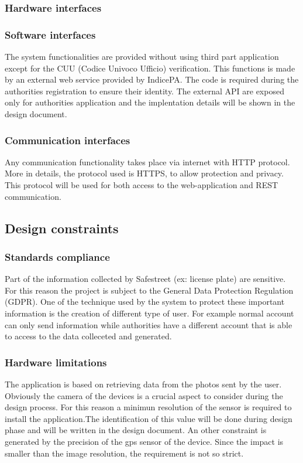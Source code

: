 \subsubsection{Hardware interfaces}

\subsubsection{Software interfaces}
The system functionalities are provided without using third part application except for the CUU (Codice Univoco Ufficio) verification. This functions is made by an external web service provided by IndicePA. The code is required during the authorities registration to ensure their identity.
The external API are exposed only for authorities application and the implentation details will be shown in the design document.

\subsubsection{Communication interfaces}
Any communication functionality takes place via internet with HTTP protocol.
More in details, the protocol used is HTTPS, to allow protection and privacy.
This protocol will be used for both access to the web-application and REST communication.

\subsection{Design constraints}
\subsubsection{Standards compliance}
Part of the information collected by Safestreet (ex: license plate) are sensitive. For this reason the project is subject to the General Data Protection Regulation (GDPR). One of the technique used by the system to protect these important information is the creation of different type of user. For example normal account can only send information while authorities have a different account that is able to access to the data colleceted and generated.

\subsubsection{Hardware limitations}
The application is based on retrieving data from the photos sent by the user. Obviously the camera of the devices is a crucial aspect to consider during the design process. For this reason a minimun resolution of the sensor is required to install the application.The identification of this value will be done during design phase and will be written in the design document.
An other constraint is generated by the precision of the gps sensor of the device. Since the impact is smaller than the image resolution, the requirement is not so strict. 

